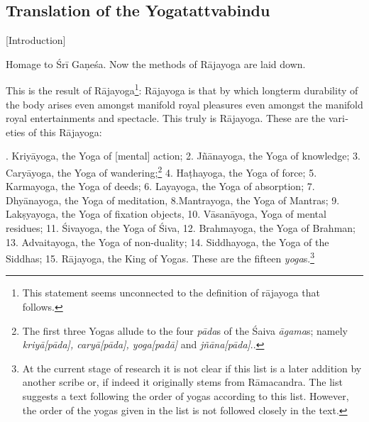       
\begin{otherlanguage}{english}
\chapter{Translation of the Yogatattvabindu}    
          \centerline{\textrm{\small{[Introduction]}}}
           \bigskip
           \begin{tlate}
             Homage to Śrī Gaṇeśa. Now the methods of Rājayoga are laid down.
           \end{tlate}
           \bigskip
           \begin{tlate}
             This is the result of Rājayoga\footnote{This statement seems unconnected to the definition of rājayoga that follows.}: Rājayoga is that by which longterm durability of the body arises even amongst manifold royal pleasures even amongst the manifold royal entertainments and spectacle. This truly is Rājayoga. These are the varieties of this Rājayoga:
      \end{tlate}
   \begin{tlate}
     . Kriyāyoga, the Yoga of [mental] action; 2. Jñānayoga, the Yoga of knowledge; 3. Caryāyoga, the Yoga of wandering;\footnote{The first three Yogas allude to the four \textit{pāda}s of the Śaiva \textit{āgama}s; namely \textit{kriyā[pāda], caryā[pāda], yoga[padā]} and \textit{jñāna[pāda]}.\parencite[77]{nishvasa2015}.} 4. Haṭhayoga, the Yoga of force; 5. Karmayoga, the Yoga of deeds; 6. Layayoga, the Yoga of absorption; 7. Dhyānayoga, the Yoga of meditation, 8.Mantrayoga, the Yoga of Mantras; 9. Lakṣyayoga, the Yoga of fixation objects, 10. Vāsanāyoga, Yoga of mental residues; 11. Śivayoga, the Yoga of Śiva, 12. Brahmayoga, the Yoga of Brahman; 13. Advaitayoga, the Yoga of non-duality; 14. Siddhayoga, the Yoga of the Siddhas; 15. Rājayoga, the King of Yogas. These are the fifteen \textit{yoga}s.\footnote{At the current stage of research it is not clear if this list is a later addition by another scribe or, if indeed it originally stems from Rāmacandra. The list suggests a text following the order of yogas according to this list. However, the order of the yogas given in the list is not followed closely in the text.}

\end{tlate}
\end{otherlanguage}
